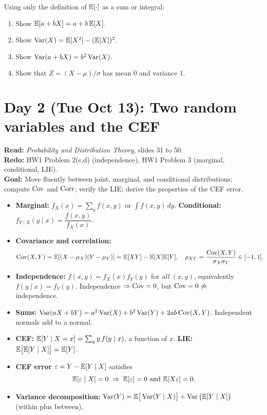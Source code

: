 \documentclass[11pt]{article}
\begin{document}
Using only the definition of $\mathbb{E}[\cdot]$ as a sum or integral:
\begin{enumerate}[label=(\alph*)]
  \item Show $\mathbb{E}[a+bX]=a+b\,\mathbb{E}[X]$.
  \item Show $\operatorname{Var}(X)=\mathbb{E}[X^2]-(\mathbb{E}[X])^2$.
  \item Show $\operatorname{Var}(a+bX)=b^2\operatorname{Var}(X)$.
  \item Show that $Z=(X-\mu)/\sigma$ has mean $0$ and variance $1$.
\end{enumerate}

\clearpage
\section{Day 2 (Tue Oct 13): Two random variables and the CEF}

\begin{planbox}
\textbf{Read:} \emph{Probability and Distribution Theory}, slides 31 to 50.\\
\textbf{Redo:} HW1 Problem 2(c,d) (independence), HW1 Problem 3 (marginal, conditional, LIE).\\
\textbf{Goal:} Move fluently between joint, marginal, and conditional distributions; compute $\operatorname{Cov}$ and $\operatorname{Corr}$; verify the LIE; derive the properties of the CEF error.
\end{planbox}

\begin{keybox}
\begin{itemize}
  \item \textbf{Marginal:} $f_X(x)=\sum_y f(x,y)$ or $\int f(x,y)\,dy$. \quad \textbf{Conditional:} $f_{Y\mid X}(y\mid x)=\dfrac{f(x,y)}{f_X(x)}$.
  \item \textbf{Covariance and correlation:}
  \[ \operatorname{Cov}(X,Y)=\mathbb{E}[(X-\mu_X)(Y-\mu_Y)]=\mathbb{E}[XY]-\mathbb{E}[X]\mathbb{E}[Y], \quad \rho_{XY}=\frac{\operatorname{Cov}(X,Y)}{\sigma_X\sigma_Y}\in[-1,1]. \]
  \item \textbf{Independence:} $f(x,y)=f_X(x)f_Y(y)$ for \emph{all} $(x,y)$, equivalently $f(y\mid x)=f_Y(y)$. Independence $\Rightarrow \operatorname{Cov}=0$, but $\operatorname{Cov}=0 \not\Rightarrow$ independence.
  \item \textbf{Sums:} $\operatorname{Var}(aX+bY)=a^2\operatorname{Var}(X)+b^2\operatorname{Var}(Y)+2ab\operatorname{Cov}(X,Y)$. Independent normals add to a normal.
  \item \textbf{CEF:} $\mathbb{E}[Y\mid X=x]=\sum_y y\,f(y\mid x)$, a function of $x$. \quad \textbf{LIE:} $\mathbb{E}\big[\mathbb{E}[Y\mid X]\big]=\mathbb{E}[Y]$.
  \item \textbf{CEF error} $\varepsilon=Y-\mathbb{E}[Y\mid X]$ satisfies
  \[ \mathbb{E}[\varepsilon\mid X]=0 \;\Rightarrow\; \mathbb{E}[\varepsilon]=0 \text{ and } \mathbb{E}[X\varepsilon]=0. \]
  \item \textbf{Variance decomposition:} $\operatorname{Var}(Y)=\mathbb{E}\big[\operatorname{Var}(Y\mid X)\big]+\operatorname{Var}\big(\mathbb{E}[Y\mid X]\big)$ (within plus between).
\end{itemize}
\end{keybox}
\end{document}
